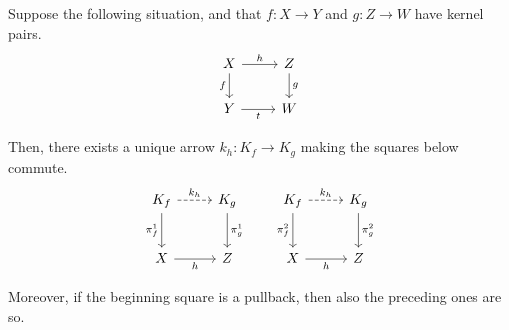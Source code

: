 \documentclass[runningheads,envcountsect]{lipics-v2021}
\begin{document}
\begin{lemma}\label{lemma:kern_pairs_pres_pullbacks}
    Suppose the following situation, and that $f: X \to Y$ and $g: Z \to W$ have kernel pairs.
    \[
        \begin{tikzcd}
            X \ar[r, "h"] \ar[d, "f"swap] & Z \ar[d, "g"] \\
            Y \ar[r, "t"swap] & W
        \end{tikzcd}
    \]
    
    Then, there exists a unique arrow $k_h: K_f \to K_g$ making the squares below commute.
    \[
        \begin{tikzcd}[row sep = 25 pt, column sep= 25 pt]
            K_f \ar[r, dashed, "{k_h}"] \ar[d, "{\pi_f^1}"swap] & K_g \ar[d, "{\pi_g^1}"] \\
            X \ar[r, "h"swap] & Z 
        \end{tikzcd}
        \qquad
        \begin{tikzcd}[row sep = 25 pt, column sep= 25 pt]
            K_f \ar[r, dashed, "{k_h}"] \ar[d, "{\pi_f^2}"swap] & K_g \ar[d, "{\pi_g^2}"] \\
            X \ar[r, "h"swap] & Z 
        \end{tikzcd}
    \]

    Moreover, if the beginning square is a pullback, then also the preceding ones are so.
\end{lemma}
\end{document}
